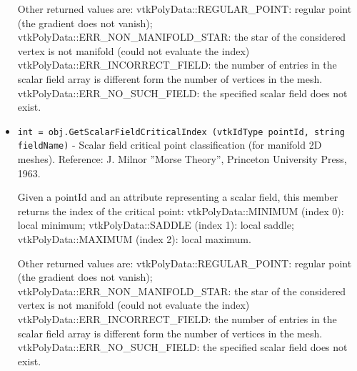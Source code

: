 \begin{itemize}
 Other returned values are:
 vtkPolyData::REGULAR\_POINT: regular point (the gradient does not vanish);
 vtkPolyData::ERR\_NON\_MANIFOLD\_STAR: the star of the considered vertex is
 not manifold (could not evaluate the index)
 vtkPolyData::ERR\_INCORRECT\_FIELD: the number of entries in the scalar field
 array is different form the number of vertices in the mesh.
 vtkPolyData::ERR\_NO\_SUCH\_FIELD: the specified scalar field does not exist.

\item  \verb|int = obj.GetScalarFieldCriticalIndex (vtkIdType pointId, string fieldName)| -  Scalar field critical point classification (for manifold 2D meshes).
 Reference: J. Milnor ''Morse Theory'', Princeton University Press, 1963.
     
 Given a pointId and an attribute representing a scalar field, this member 
 returns the index of the critical point:
 vtkPolyData::MINIMUM (index 0): local minimum;
 vtkPolyData::SADDLE  (index 1): local saddle;
 vtkPolyData::MAXIMUM (index 2): local maximum.

 Other returned values are:
 vtkPolyData::REGULAR\_POINT: regular point (the gradient does not vanish);
 vtkPolyData::ERR\_NON\_MANIFOLD\_STAR: the star of the considered vertex is
 not manifold (could not evaluate the index)
 vtkPolyData::ERR\_INCORRECT\_FIELD: the number of entries in the scalar field
 array is different form the number of vertices in the mesh.
 vtkPolyData::ERR\_NO\_SUCH\_FIELD: the specified scalar field does not exist.

\end{itemize}
